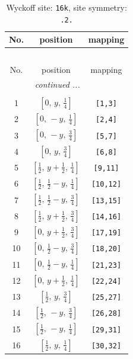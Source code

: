 \documentclass[fleqn,8pt]{jsarticle}
\begin{document}
\renewcommand{\arraystretch}{1.2}
\begin{longtable}{ccc}
\caption{Wyckoff site: {\tt 16k}, site symmetry: {\tt .2.}}
 \\
 \hline \hline
No. & position & mapping \\ \hline \endfirsthead

\multicolumn{2}{l}{\tablename\ \thetable{}} \\
 \hline \hline
No. & position & mapping \\ \hline \endhead

 \hline \hline
\multicolumn{2}{r}{\footnotesize\it continued ...} \\ \endfoot

 \hline \hline
\multicolumn{2}{r}{} \\ \endlastfoot

1 & $\left[ 0,\, y,\, \frac{1}{4} \right]$ & {\tt [1,3]} \\ \hline
2 & $\left[ 0,\, - y,\, \frac{1}{4} \right]$ & {\tt [2,4]} \\ \hline
3 & $\left[ 0,\, - y,\, \frac{3}{4} \right]$ & {\tt [5,7]} \\ \hline
4 & $\left[ 0,\, y,\, \frac{3}{4} \right]$ & {\tt [6,8]} \\ \hline
5 & $\left[ \frac{1}{2},\, y + \frac{1}{2},\, \frac{1}{4} \right]$ & {\tt [9,11]} \\ \hline
6 & $\left[ \frac{1}{2},\, \frac{1}{2} - y,\, \frac{1}{4} \right]$ & {\tt [10,12]} \\ \hline
7 & $\left[ \frac{1}{2},\, \frac{1}{2} - y,\, \frac{3}{4} \right]$ & {\tt [13,15]} \\ \hline
8 & $\left[ \frac{1}{2},\, y + \frac{1}{2},\, \frac{3}{4} \right]$ & {\tt [14,16]} \\ \hline
9 & $\left[ 0,\, y + \frac{1}{2},\, \frac{3}{4} \right]$ & {\tt [17,19]} \\ \hline
10 & $\left[ 0,\, \frac{1}{2} - y,\, \frac{3}{4} \right]$ & {\tt [18,20]} \\ \hline
11 & $\left[ 0,\, \frac{1}{2} - y,\, \frac{1}{4} \right]$ & {\tt [21,23]} \\ \hline
12 & $\left[ 0,\, y + \frac{1}{2},\, \frac{1}{4} \right]$ & {\tt [22,24]} \\ \hline
13 & $\left[ \frac{1}{2},\, y,\, \frac{3}{4} \right]$ & {\tt [25,27]} \\ \hline
14 & $\left[ \frac{1}{2},\, - y,\, \frac{3}{4} \right]$ & {\tt [26,28]} \\ \hline
15 & $\left[ \frac{1}{2},\, - y,\, \frac{1}{4} \right]$ & {\tt [29,31]} \\ \hline
16 & $\left[ \frac{1}{2},\, y,\, \frac{1}{4} \right]$ & {\tt [30,32]} \\
\end{longtable}
\end{document}
